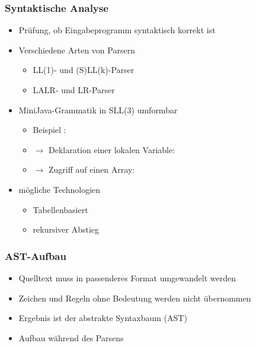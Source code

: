 \begin{frame}
    \frametitle{Syntaktische Analyse}
    \begin{itemize}
    \item Prüfung, ob Eingabeprogramm syntaktisch korrekt ist
    \item Verschiedene Arten von Parsern
    	\begin{itemize}
    	\item LL(1)- und (S)LL(k)-Parser
    	\item LALR- und LR-Parser
    	\end{itemize}
    \item MiniJava-Grammatik in SLL(3) umformbar \pause
    \begin{itemize}
    	\item Beispiel \code{a[}:
    	\item[] $\rightarrow$ Deklaration einer lokalen Variable: 
    	\item[] $\rightarrow$ Zugriff auf einen Array: 
    \end{itemize} \pause
    \item mögliche Technologien
	    \begin{itemize}
		\item Tabellenbasiert
		\item rekursiver Abstieg
    	\end{itemize}
    \end{itemize}
\end{frame}

\begin{frame}
	\frametitle{AST-Aufbau}
	\begin{itemize}
	\item Quelltext muss in passenderes Format umgewandelt werden
	\item Zeichen und Regeln ohne Bedeutung werden nicht übernommen
	\item Ergebnis ist der abstrakte Syntaxbaum (AST)
	\item Aufbau während des Parsens
	\end{itemize}
\end{frame}

